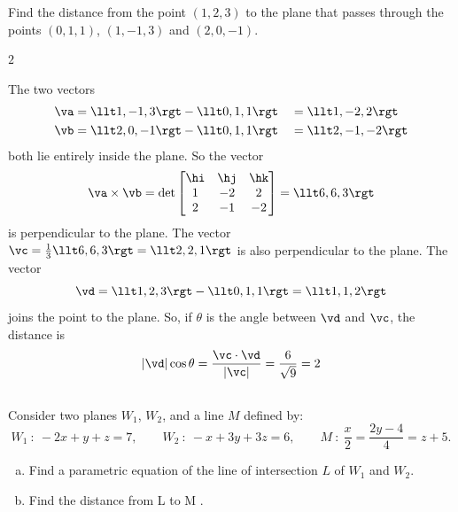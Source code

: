 \begin{question}[M200 2004A] %
Find the distance from the point $(1,2,3)$ to the plane that passes through
the points $(0,1,1)$, $(1,-1,3)$ and $(2,0,-1)$.
\end{question}

%

\begin{answer}
$2$
\end{answer}

\begin{solution}
The two vectors
\begin{alignat*}{3}
\va&=\llt 1,-1,3\rgt - \llt 0,1,1\rgt &&= \llt 1,-2, 2\rgt \\
\vb&=\llt 2,0,-1\rgt - \llt 0,1,1\rgt &&= \llt 2,-1,-2\rgt
\end{alignat*}
both lie entirely inside the plane. So the vector
\begin{equation*}
\va\times\vb
   =\det\left[\begin{matrix}
           \hi & \hj & \hk \\
            1  &  -2  &  2 \\
            2  &  -1 &  -2
  \end{matrix}\right]
   =\llt 6,6,3\rgt
\end{equation*}
is perpendicular to the plane. The vector 
     $\vc=\frac{1}{3}\llt 6,6,3\rgt =\llt 2,2,1\rgt$
is also perpendicular to the plane. The vector 
\begin{equation*}
\vd=\llt 1,2,3\rgt-\llt 0,1,1\rgt=\llt 1,1,2\rgt
\end{equation*}
joins the point to the plane. So, if $\theta$ is the angle between $\vd$ and
$\vc$, the distance is
\begin{equation*}
|\vd|\cos\theta=\frac{\vc\cdot\vd}{|\vc|}=\frac{6}{\sqrt{9}}=2
\end{equation*}

\end{solution}



\subsection*{\Application}

\begin{question}[M200 2014A] %
Consider two planes $W_1$, $W_2$, and a line $M$ defined by:
\begin{equation*}
W_1\ :\  -2x + y + z = 7,\qquad
W_2\ :\ -x + 3y + 3z = 6,\qquad
M\ :\ 
\frac{x}{2} = \frac{2y-4}{4} = z + 5.
\end{equation*}
\begin{enumerate}[(a)]
\item
Find a parametric equation of the line of intersection $L$ of $W_1$ and $W_2$.
\item
Find the distance from L to M .
\end{enumerate}
\end{question}

